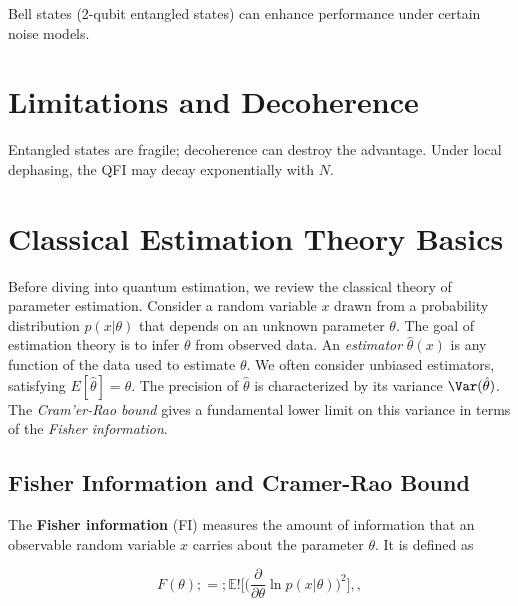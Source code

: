 Bell states (2-qubit entangled states) can enhance performance under
certain noise models.

\section{Limitations and Decoherence}

Entangled states are fragile; decoherence can destroy the
advantage. Under local dephasing, the QFI may decay exponentially with
$N$.




\section{Classical Estimation Theory Basics}

\label{sec:classical}



Before diving into quantum estimation, we review the classical theory
of parameter estimation. Consider a random variable $x$ drawn from a
probability distribution $p(x|\theta)$ that depends on an unknown
parameter $\theta$. The goal of estimation theory is to infer $\theta$
from observed data. An \textit{estimator} $\hat{\theta}(x)$ is any
function of the data used to estimate $\theta$. We often consider
unbiased estimators, satisfying $E[\hat{\theta}] = \theta$. The
precision of $\hat{\theta}$ is characterized by its variance
$\Var(\hat{\theta})$. The \textit{Cram'er-Rao bound} gives a
fundamental lower limit on this variance in terms of the
\textit{Fisher information}.



\subsection{Fisher Information and Cramer-Rao Bound}



The \textbf{Fisher information} (FI) measures the amount of information that an observable random variable $x$ carries about the parameter $\theta$. It is defined as

\begin{equation}

F(\theta) ;=; \mathbb{E}!\Bigg[\Big(\frac{\partial}{\partial \theta}\ln p(x|\theta)\Big)^2\Bigg] ,,

\label{eq:FI-def}

\end{equation}

